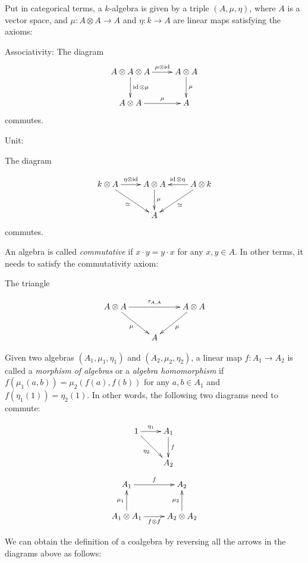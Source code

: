 Put in categorical terms, a $k$-algebra is given by a triple $(A, \mu, \eta)$,
where $A$ is a vector space, and $\mu: A \otimes A \to A$ and $\eta: k \to A$
are linear maps satisfying the axioms:

Associativity:
The diagram
\begin{equation}
\xymatrix{
A \otimes A \otimes A \ar[d]^-{\id \otimes \mu} \ar[r]^-{\mu \otimes \id} & A \otimes A \ar[d]^-{\mu}\\
 A \otimes A \ar[r]^-\mu & A 
}
\end{equation}
commutes.

Unit: 

The diagram

\begin{equation}
    \xymatrix{
    k \otimes A \ar[r]^-{\eta \otimes \id} \ar[rd]_\simeq & A \otimes A \ar[d]^-\mu & A \otimes k \ar[l]_{\id \otimes \eta} \ar[ld]^-{\simeq} \\
    & A &
    }
\end{equation}
commutes.

An algebra is called \emph{commutative} if $x \cdot y = y \cdot x$ for any
$x,y\in A$. In other terms, it needs to satisfy the commutativity axiom:

The triangle 

\begin{equation}
    \xymatrix{
    A \otimes A \ar[rr]^-{\tau_{A,A}} \ar[rd]_\mu & & A \otimes A \ar[ld]^-\mu \\
    & A &
    }
\end{equation}

Given two algebras $(A_1, \mu_1, \eta_1)$ and $(A_2, \mu_2, \eta_2)$, a linear
map $f: A_1 \to A_2$ is called a \emph{morphism of algebras} or a
\emph{algebra homomorphism} if $f(\mu_1(a,b)) = \mu_2(f(a), f(b))$ for any
$a,b\in A_1$ and $f(\eta_1(1)) = \eta_2(1)$. In other words, the following two
diagrams need to commute:

\begin{equation}
    \xymatrix{
    1 \ar[r]^-{\eta_1} \ar[rd]_{\eta_2} & A_1 \ar[d]^-f \\
    & A_2
    }
\end{equation}
\begin{equation}
    \xymatrix{
    A_1 \ar[r]^-f & A_2 \\
    A_1 \otimes A_1 \ar[u]^-{\mu_1} \ar[r]_-{f\otimes f} & A_2 \otimes A_2 \ar[u]^-{\mu_2}
    }
\end{equation}


We can obtain the definition of a coalgebra by reversing all the arrows in the
diagrams above as follows:


